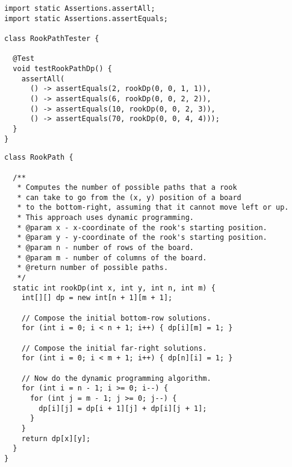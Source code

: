 \begin{lstlisting}[language=MyJava]
import static Assertions.assertAll;
import static Assertions.assertEquals;

class RookPathTester {

  @Test
  void testRookPathDp() {
    assertAll(
      () -> assertEquals(2, rookDp(0, 0, 1, 1)),
      () -> assertEquals(6, rookDp(0, 0, 2, 2)),
      () -> assertEquals(10, rookDp(0, 0, 2, 3)),
      () -> assertEquals(70, rookDp(0, 0, 4, 4)));
  }
}
\end{lstlisting}

\begin{lstlisting}[language=MyJava]
class RookPath {

  /**
   * Computes the number of possible paths that a rook 
   * can take to go from the (x, y) position of a board 
   * to the bottom-right, assuming that it cannot move left or up. 
   * This approach uses dynamic programming.
   * @param x - x-coordinate of the rook's starting position.
   * @param y - y-coordinate of the rook's starting position.
   * @param n - number of rows of the board.
   * @param m - number of columns of the board.
   * @return number of possible paths.
   */
  static int rookDp(int x, int y, int n, int m) {
    int[][] dp = new int[n + 1][m + 1];

    // Compose the initial bottom-row solutions.
    for (int i = 0; i < n + 1; i++) { dp[i][m] = 1; }

    // Compose the initial far-right solutions.
    for (int i = 0; i < m + 1; i++) { dp[n][i] = 1; }

    // Now do the dynamic programming algorithm.
    for (int i = n - 1; i >= 0; i--) {
      for (int j = m - 1; j >= 0; j--) {
        dp[i][j] = dp[i + 1][j] + dp[i][j + 1];
      }
    }
    return dp[x][y];
  }
}
\end{lstlisting}
